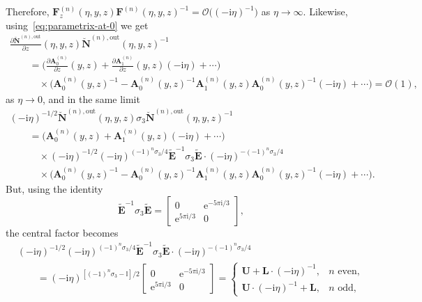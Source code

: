 \documentclass[11pt]{article}
\numberwithin{equation}{section}
\numberwithin{equation}{section}
\begin{document}
Therefore, $\mathbf{F}^{(n)}_z(\eta,y,z)\mathbf{F}^{(n)}(\eta,y,z)^{-1}=\mathcal{O}\bigl((-\mathrm{i}\eta)^{-1}\bigr)$ as $\eta\to\infty$. Likewise, using~\eqref{eq:parametrix-at-0} we get
\begin{gather*}
\frac{\partial\breve{\mathbf{N}}^{(n),\mathrm{out}}}{\partial z}(\eta,y,z)\breve{\mathbf{N}}^{(n),\mathrm{out}}(\eta,y,z)^{-1}\\
\qquad {}=\bigg(\frac{\partial\mathbf{A}^{(n)}_0}{\partial z}(y,z) + \frac{\partial\mathbf{A}^{(n)}_1}{\partial z}(y,z) (-\mathrm{i}\eta) +\cdots\bigg)\\
\qquad\quad{}\times\bigl(\mathbf{A}^{(n)}_0(y,z)^{-1} - \mathbf{A}^{(n)}_0(y,z)^{-1}\mathbf{A}^{(n)}_1(y,z)\mathbf{A}_0^{(n)}(y,z)^{-1}(-\mathrm{i}\eta) + \cdots\bigr)=\mathcal{O}(1),
\end{gather*}
as $\eta\to 0$, and in the same limit
\begin{gather*}
(-\mathrm{i}\eta)^{-1/2}\breve{\mathbf{N}}^{(n),\mathrm{out}}(\eta,y,z)\sigma_3\breve{\mathbf{N}}^{(n),\mathrm{out}}(\eta,y,z)^{-1}\\
\qquad =\bigl(\mathbf{A}_0^{(n)}(y,z) + \mathbf{A}_1^{(n)}(y,z)(-\mathrm{i}\eta) + \cdots\bigr)\\
\qquad\quad{}\times (-\mathrm{i}\eta)^{-1/2}(-\mathrm{i}\eta)^{(-1)^n\sigma_3/4}\widetilde{\mathbf{E}}^{-1}\sigma_3\widetilde{\mathbf{E}}\cdot(-\mathrm{i}\eta)^{-(-1)^n\sigma_3/4}\\
\qquad\quad{}\times\bigl(\mathbf{A}^{(n)}_0(y,z)^{-1}-\mathbf{A}_0^{(n)}(y,z)^{-1}\mathbf{A}_1^{(n)}(y,z)\mathbf{A}_0^{(n)}(y,z)^{-1}(-\mathrm{i}\eta) + \cdots\bigr).
\end{gather*}
But, using the identity
\begin{equation*}
\widetilde{\mathbf{E}}^{-1}\sigma_3\widetilde{\mathbf{E}} = \begin{bmatrix}0 & \mathrm{e}^{-5\pi\mathrm{i}/3}\\\mathrm{e}^{5\pi\mathrm{i}/3} & 0\end{bmatrix},
\end{equation*}
the central factor becomes{\samepage
\begin{align}
& (-\mathrm{i}\eta)^{-1/2}(-\mathrm{i}\eta)^{(-1)^n\sigma_3/4}\widetilde{\mathbf{E}}^{-1}\sigma_3\widetilde{\mathbf{E}}\cdot(-\mathrm{i}\eta)^{-(-1)^n\sigma_3/4}
\nonumber\\
&\qquad =(-\mathrm{i}\eta)^{[(-1)^n\sigma_3-\mathbb{I}]/2}\begin{bmatrix}0 & \mathrm{e}^{-5\pi\mathrm{i}/3}\\\mathrm{e}^{5\pi\mathrm{i}/3} & 0\end{bmatrix} =\begin{cases}\mathbf{U} + \mathbf{L}\cdot(-\mathrm{i}\eta)^{-1},&\text{$n$ even}, \\\mathbf{U}\cdot(-\mathrm{i}\eta)^{-1} + \mathbf{L},&\text{$n$ odd},\end{cases} \label{eq:central-factor}
 \end{align}}%
\end{document}
